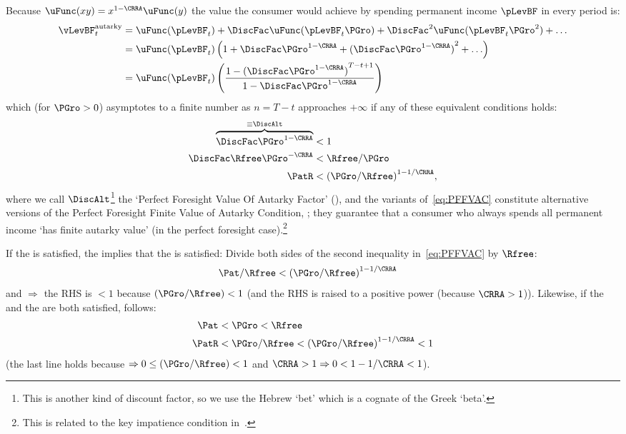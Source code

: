 \documentclass[BufferStockTheory]{subfiles}
\begin{document}
Because $\uFunc(xy) = x^{1-\CRRA}\uFunc(y)$ the value the consumer would achieve by spending permanent income $\pLevBF$ in every period is:
\begin{equation}\label{eq:ValuePFAnalyticalAutarky}
  \begin{split}
    \vLevBF_{t}^{\text{autarky}}  & = \uFunc(\pLevBF_{t})+\DiscFac \uFunc(\pLevBF_{t}\PGro)+\DiscFac^{2} \uFunc(\pLevBF_{t} \PGro^{2})+\ldots 
    \\  & = \uFunc(\pLevBF_{t})\left(1+\DiscFac \PGro^{1-\CRRA}+{(\DiscFac \PGro^{1-\CRRA})}^{2}+\ldots\right) 
    \\  & = \uFunc(\pLevBF_{t})\left(\frac{1-{(\DiscFac \PGro^{1-\CRRA})}^{T-t+1}}{1-\DiscFac \PGro^{1-\CRRA}}\right) 
  \end{split}
\end{equation}
which (for $\PGro>0$) asymptotes to a finite number as $n=T-t$ approaches $+\infty$ if any of these equivalent conditions holds:
\begin{equation}\label{eq:PFFVAC}
  \begin{split}
    \overbrace{\DiscFac \PGro^{1-\CRRA} }^{\equiv \DiscAlt}  & < 1  
    \\ \DiscFac \Rfree \PGro^{-\CRRA}  & < \Rfree/\PGro 
    \\ \PatR    & < {(\PGro/\Rfree)}^{1-1/\CRRA},  
  \end{split}
\end{equation}
where we call $\DiscAlt$\footnote{This is another kind of discount factor, so we use the Hebrew `bet' which is a cognate of the Greek `beta'.} the `Perfect Foresight Value Of Autarky Factor' ({\PFVAF}), and the variants of~\eqref{eq:PFFVAC} constitute alternative versions of the Perfect Foresight Finite Value of Autarky Condition, \PFFVAC; they guarantee that a consumer who always spends all permanent income `has finite autarky value'  (in the perfect foresight case).\footnote{This is related to the key impatience condition in~\cite{asHomogeneous}.} %

If the {\FHWC} is satisfied, the {\PFFVAC} implies that the {\RIC} is satisfied:  Divide both sides of the second inequality in~\eqref{eq:PFFVAC} by $\Rfree$:
  \begin{align}
    \Pat/\Rfree & < {(\PGro/\Rfree)}^{1-1/\CRRA}  \label{eq:FHWCandPFFVACimplyRIC}
  \end{align}
  and {\FHWC} $\Rightarrow$ the RHS is $< 1$ because $(\PGro/\Rfree) < 1$ (and the RHS is raised to a positive power (because $\CRRA>1$)).  Likewise, if the {\FHWC} and the {\GIC} are both satisfied, {\PFFVAC} follows:
\begin{equation}\label{eq:GICandFHWCimplyPFFVAC}
  \begin{split}
    \Pat & < \PGro < \Rfree 
    \\   \PatR & < \PGro/\Rfree < {(\PGro/\Rfree)}^{1-1/\CRRA} < 1
  \end{split}
\end{equation}
(the last line holds because {\FHWC} $\Rightarrow 0 \leq (\PGro/\Rfree) < 1$ and $\CRRA > 1 \Rightarrow 0 < 1-1/\CRRA < 1$).
\end{document}

